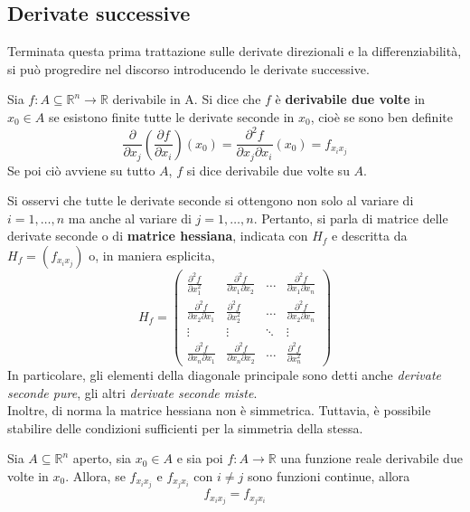 \subsection{Derivate successive}
Terminata questa prima trattazione sulle derivate direzionali e la differenziabilità, si può progredire nel discorso introducendo le derivate successive.
\begin{definition}
    Sia $f:A \subseteq \mathbb{R}^n \to \mathbb{R}$ derivabile in A. Si dice che $f$ è \textbf{derivabile due volte} in $x_0 \in A$ se esistono finite tutte le derivate seconde in $x_0$, cioè se sono ben definite
    \begin{equation}
        \frac{\partial}{\partial x_j}\left(\frac{\partial f}{\partial x_i}\right)(x_0)=\frac{\partial^2f}{\partial x_j \partial x_i}(x_0)=f_{x_ix_j}
    \end{equation}
    Se poi ciò avviene su tutto $A$, $f$ si dice derivabile due volte su $A$.
\end{definition}
Si osservi che tutte le derivate seconde si ottengono non solo al variare di $i=1, \dots, n$ ma anche al variare di $j=1, \dots, n$. Pertanto, si parla di matrice delle derivate seconde o di \textbf{matrice hessiana}, indicata con $H_f$ e descritta da $H_f=(f_{x_ix_j})$ o, in maniera esplicita,
\begin{equation} \label{Eq: Matrice hessiana}
    H_f = \begin{pmatrix}
    \frac{\partial^2 f}{\partial x_1^2} & \frac{\partial^2 f}{\partial x_1 \partial x_2} & \dots  & \frac{\partial^2 f}{\partial x_1 \partial x_n} \\
    \frac{\partial^2 f}{\partial x_2 \partial x_1} & \frac{\partial^2 f}{\partial x_2^2}  & \dots  & \frac{\partial^2 f}{\partial x_2 \partial x_n} \\
    \vdots & \vdots & \ddots & \vdots \\
    \frac{\partial^2 f}{\partial x_n \partial x_1} & \frac{\partial^2 f}{\partial x_n \partial x_2} & \dots  & \frac{\partial^2 f}{\partial x_n^2}
    \end{pmatrix}
\end{equation}
In particolare, gli elementi della diagonale principale sono detti anche \textit{derivate seconde pure}, gli altri \textit{derivate seconde miste}.\\
Inoltre, di norma la matrice hessiana non è simmetrica. Tuttavia, è possibile stabilire delle condizioni sufficienti per la simmetria della stessa.
\begin{theorem} \label{Teo: Schwarz}
    Sia $A \subseteq \mathbb{R}^n$ aperto, sia $x_0 \in A$ e sia poi $f: A \to \mathbb{R}$ una funzione reale derivabile due volte in $x_0$. Allora, se $f_{x_ix_j}$ e $f_{x_jx_i}$ con $i \neq j$ sono funzioni continue, allora 
    \begin{equation}
        f_{x_ix_j}=f_{x_jx_i}
    \end{equation}
\end{theorem}
